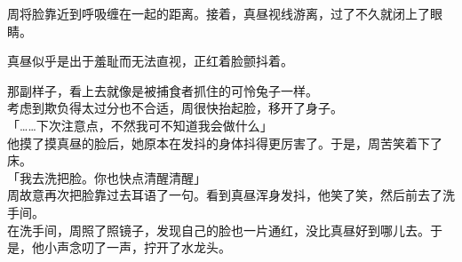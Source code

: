周将脸靠近到呼吸缠在一起的距离。接着，真昼视线游离，过了不久就闭上了眼睛。

真昼似乎是出于羞耻而无法直视，正红着脸颤抖着。

那副样子，看上去就像是被捕食者抓住的可怜兔子一样。\\

考虑到欺负得太过分也不合适，周很快抬起脸，移开了身子。\\

「……下次注意点，不然我可不知道我会做什么」\\

他摸了摸真昼的脸后，她原本在发抖的身体抖得更厉害了。于是，周苦笑着下了床。\\

「我去洗把脸。你也快点清醒清醒」\\

周故意再次把脸靠过去耳语了一句。看到真昼浑身发抖，他笑了笑，然后前去了洗手间。\\

在洗手间，周照了照镜子，发现自己的脸也一片通红，没比真昼好到哪儿去。于是，他小声念叨了一声，拧开了水龙头。
